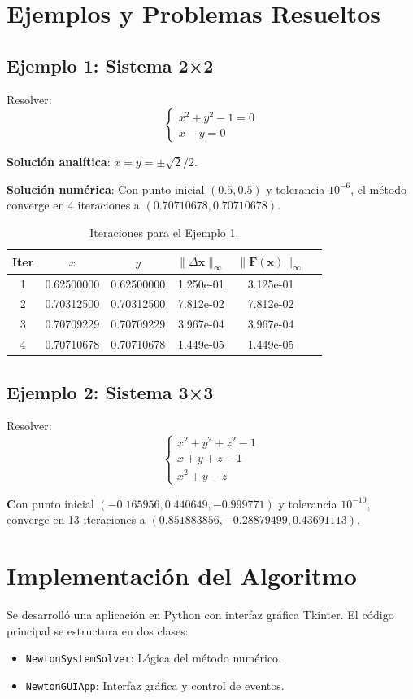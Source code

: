 \documentclass[12pt, letterpaper]{article}
\begin{document}
\section{Ejemplos y Problemas Resueltos}
\subsection{Ejemplo 1: Sistema 2×2}
Resolver:
\[
\begin{cases}
x^2 + y^2 - 1 = 0 \\
x - y = 0
\end{cases}
\]

\textbf{Solución analítica}: $x = y = \pm \sqrt{2}/2$.

\textbf{Solución numérica}: Con punto inicial $(0.5, 0.5)$ y tolerancia $10^{-6}$, el método converge en 4 iteraciones a $(0.70710678, 0.70710678)$.

\begin{table}[H]
\centering
\begin{tabular}{cccccc}
\toprule
Iter & $x$ & $y$ & $\|\Delta\mathbf{x}\|_\infty$ & $\|\mathbf{F}(\mathbf{x})\|_\infty$ \\
\midrule
1 & 0.62500000 & 0.62500000 & 1.250e-01 & 3.125e-01 \\
2 & 0.70312500 & 0.70312500 & 7.812e-02 & 7.812e-02 \\
3 & 0.70709229 & 0.70709229 & 3.967e-04 & 3.967e-04 \\
4 & 0.70710678 & 0.70710678 & 1.449e-05 & 1.449e-05 \\
\bottomrule
\end{tabular}
\caption{Iteraciones para el Ejemplo 1.}
\end{table}

\subsection{Ejemplo 2: Sistema 3×3}
Resolver:
\[
\begin{cases}
x^2 + y^2 + z^2 - 1 \\
x + y + z - 1 \\
x^2 + y - z
\end{cases}
\]

\textbf Con punto inicial $(−0.165956,0.440649,−0.999771)$ y tolerancia $10^{-10}$, converge en 13 iteraciones a $(0.851883856,−0.28879499,0.43691113)$.

\section{Implementación del Algoritmo}
Se desarrolló una aplicación en Python con interfaz gráfica Tkinter. El código principal se estructura en dos clases:
\begin{itemize}
    \item \texttt{NewtonSystemSolver}: Lógica del método numérico.
    \item \texttt{NewtonGUIApp}: Interfaz gráfica y control de eventos.
\end{itemize}
\end{document}
